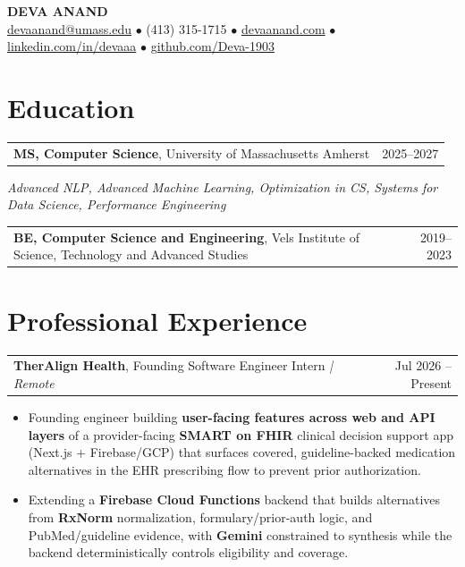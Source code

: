 \documentclass[letterpaper,11pt]{article}
\makeatletter
\newcommand{\eduItem}[3]{%
  \begin{tabular*}{\textwidth}{@{}l@{\extracolsep{\fill}}r@{}}
    \textbf{#1}, #2 & #3 \\
  \end{tabular*}\par
}
\newcommand{\expItem}[4]{%
  \vspace{2pt}
  \begin{tabular*}{\textwidth}{@{}l@{\extracolsep{\fill}}r@{}}
    \textbf{#1}, #2 \textit{| #3} & #4 \\
  \end{tabular*}\par\vspace{-3pt}
}
\makeatother
\begin{document}
\begin{center}
    {\fontsize{18}{20}\selectfont\bfseries DEVA ANAND}\\ \vspace{3pt}
    {\small
    \href{mailto:devaanand@umass.edu}{devaanand@umass.edu}
    \enspace$\bullet$\enspace
    (413) 315-1715
    \enspace$\bullet$\enspace
    \href{https://devaanand.com}{devaanand.com}
    \enspace$\bullet$\enspace
    \href{https://linkedin.com/in/devaaa/}{linkedin.com/in/devaaa}
    \enspace$\bullet$\enspace
    \href{https://github.com/Deva-1903}{github.com/Deva-1903}}
\end{center}
\vspace{-8pt}

\section{Education}
\eduItem{MS, Computer Science}{University of Massachusetts Amherst}{2025--2027}
{\small\textit{Advanced NLP, Advanced Machine Learning, Optimization in CS, Systems for Data Science, Performance Engineering}}\par
\vspace{3pt}
\eduItem{BE, Computer Science and Engineering}{Vels Institute of Science, Technology and Advanced Studies}{2019--2023}

\section{Professional Experience}

\expItem{TherAlign Health}{Founding Software Engineer Intern}{Remote}{Jul 2026 -- Present}
\begin{itemize}
  \item Founding engineer building \textbf{user-facing features across web and API layers} of a provider-facing \textbf{SMART on FHIR} clinical decision support app (Next.js + Firebase/GCP) that surfaces covered, guideline-backed medication alternatives in the EHR prescribing flow to prevent prior authorization.
  \item Extending a \textbf{Firebase Cloud Functions} backend that builds alternatives from \textbf{RxNorm} normalization, formulary/prior-auth logic, and PubMed/guideline evidence, with \textbf{Gemini} constrained to synthesis while the backend deterministically controls eligibility and coverage.
\end{itemize}
\end{document}
